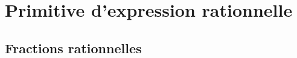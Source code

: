 \documentclass{magnolia}
\begin{document}

\section{Primitive d'expression rationnelle}
\subsection{Fractions rationnelles}
\end{document}
